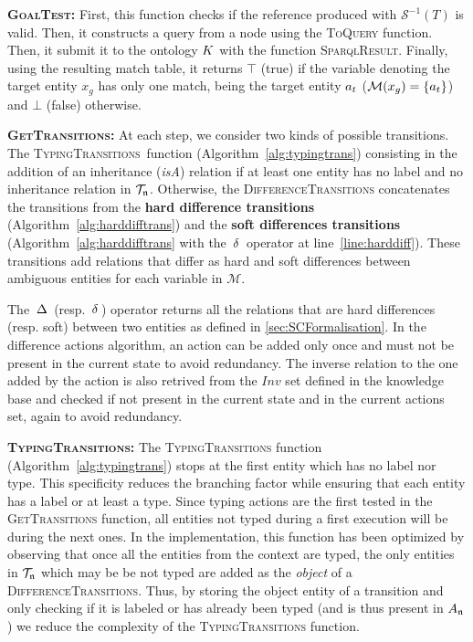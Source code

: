 \documentclass[a4paper,11pt,twoside]{StyleThese}
\begin{document}
\textbf{\textsc{GoalTest}:}
First, this function checks if the reference produced with $\mathcal{S}^{-1}(T)$ is valid. Then, it constructs a \sparql{} query from a node using the \textsc{ToQuery} function. Then, it submit it to the ontology $K$ with the function \textsc{SparqlResult}. Finally, using the resulting match table, it returns $\top$ (true) if the variable denoting the target entity $x_g$ has only one match, being the target entity $a_t$ ($\mathcal{M}(x_g) = \{a_t\}$) and $\bot$ (false) otherwise.

\textbf{\textsc{GetTransitions}:}
At each step, we consider two kinds of possible transitions. The \textsc{TypingTransitions}~function (Algorithm~\ref{alg:typingtrans}) consisting in the addition of an inheritance (\textit{isA}) relation if at least one entity has no label and no inheritance relation in $\mathcal{T}_{\mathfrak{n}}$. Otherwise, the \textsc{DifferenceTransitions} concatenates the transitions from the \textbf{hard difference transitions} (Algorithm~\ref{alg:harddifftrans}) and the \textbf{soft differences transitions} (Algorithm~\ref{alg:harddifftrans} with the $\,\delta\,$ operator at line~\ref{line:harddiff}). These transitions add relations that differ as hard and soft differences between ambiguous entities for each variable in $\mathcal{M}$.

The $\,\Delta\,$ (resp. $\,\delta\,$) operator returns all the relations that are hard differences (resp. soft) between two entities as defined in \ref{sec:SCFormalisation}. In the difference actions algorithm, an action can be added only once and must not be present in the current state to avoid redundancy. The inverse relation to the one added by the action is also retrived from the $Inv$ set defined in the knowledge base and checked if not present in the current state and in the current actions set, again to avoid redundancy. 

\textbf{\textsc{TypingTransitions}:}
The \textsc{TypingTransitions} function (Algorithm~\ref{alg:typingtrans}) stops at the first entity which has no label nor type. This specificity reduces the branching factor while ensuring that each entity has a label or at least a type. Since typing actions are the first tested in the \textsc{GetTransitions} function, all entities not typed during a first execution will be during the next ones. In the implementation, this function has been optimized by observing that once all the entities from the context are typed, the only entities in $\mathcal{T}_{\mathfrak{n}}$ which may be be not typed are added as the \textit{object} of a \textsc{DifferenceTransitions}. Thus, by storing the object entity of a transition and only checking if it is labeled or has already been typed (and is thus present in $A_{\mathfrak{n}}$) we reduce the complexity of the \textsc{TypingTransitions} function.
\end{document}
